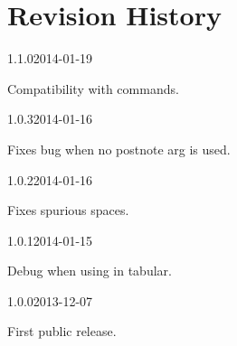 \documentclass{ltxdockit}[2011/03/25]
\begin{document}
\section{Revision History}
\begin{changelog}

\begin{release}{1.1.0}{2014-01-19}
\item Compatibility with  commands.
\end{release}
\begin{release}{1.0.3}{2014-01-16}
\item Fixes bug when no postnote arg is used.
\end{release}

\begin{release}{1.0.2}{2014-01-16}
\item Fixes spurious spaces.
\end{release}

\begin{release}{1.0.1}{2014-01-15}
\item Debug when using in tabular.
\end{release}


\begin{release}{1.0.0}{2013-12-07}
\item First public release.
\end{release}

\end{changelog}
\end{document}
